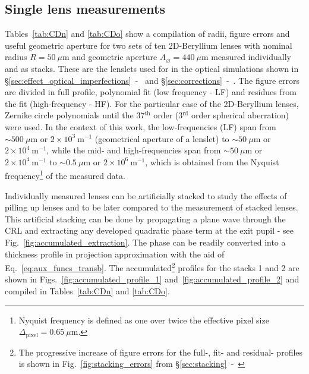 \begin{refsection}
\subsection{Single lens measurements}\label{sec:single_lens}

Tables~\ref{tab:CDn} and \ref{tab:CDo} show a compilation of radii, figure errors and useful geometric aperture for two sets of ten 2D-Beryllium lenses with nominal radius $R=50~\mu\text{m}$ and geometric aperture $A_{\diameter}=440~\mu\text{m}$ measured individually and as stacks. These are the lenslets used for in the optical simulations shown in \S\ref{sec:effect_optical_imperfections}~-~\textit{} and \S\ref{sec:corrections}~-~\textit{}. The figure errors are divided in full profile, polynomial fit (low frequency - LF) and residues from the fit (high-frequency - HF). For the particular case of the 2D-Beryllium lenses, Zernike circle polynomials until the 37$^\text{th}$ order (3$^\text{rd}$ order spherical aberration) were used. In the context of this work, the low-frequencies (LF) span from $\sim500~\mu$m or $2\times10^{3}~\text{m}^{-1}$ (geometrical aperture of a lenslet) to $\sim50~\mu$m or $2\times10^{4}~\text{m}^{-1}$, while the mid- and high-frequencies span from $\sim50~\mu$m or $2\times10^{4}~\text{m}^{-1}$ to $\sim0.5~\mu$m or $2\times10^{6}~\text{m}^{-1}$, which is obtained from the Nyquist frequency\footnote{Nyquist frequency is defined as one over twice the effective pixel size $\Delta_\text{pixel}=0.65~\mu$m.} of the measured data.

Individually measured lenses can be artificially stacked to study the effects of pilling up lenses and to be later compared to the measurement of stacked lenses. This artificial stacking can be done by propagating a plane wave through the CRL and extracting any developed quadratic phase term at the exit pupil - see Fig.~\ref{fig:accumulated_extraction}. The phase can be readily converted into a thickness profile in projection approximation with the aid of Eq.~\ref{eq:aux_funcs_transb}. The accumulated\footnote{The progressive increase of figure errors for the full-, fit- and residual- profiles is shown in Fig.~\ref{fig:stacking_errors} from \S\ref{sec:stacking}~-~\textit{}} profiles for the stacks 1 and 2 are shown in Figs.~\ref{fig:accumulated_profile_1} and~\ref{fig:accumulated_profile_2} and compiled in Tables~\ref{tab:CDn} and \ref{tab:CDo}.  


\end{refsection}

